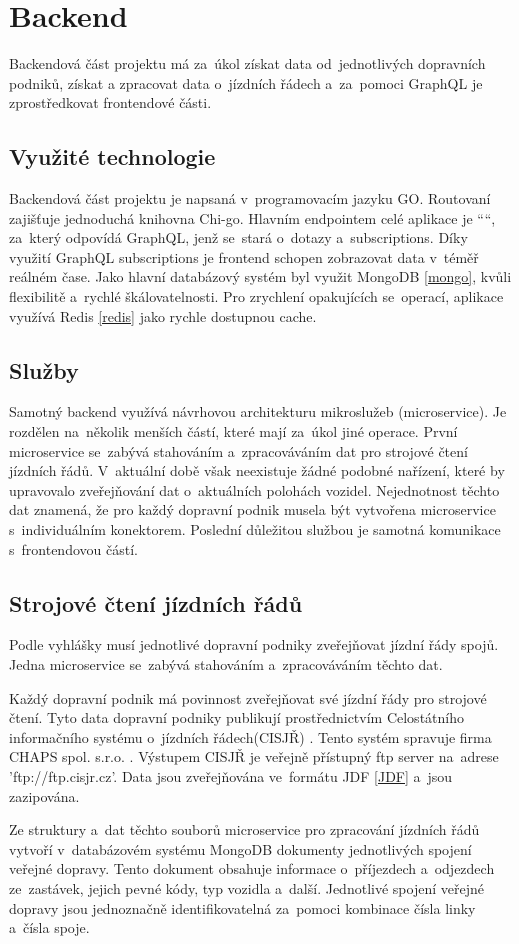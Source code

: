 \section{Backend}
Backendová část projektu má za~úkol získat data od~jednotlivých dopravních podniků, získat a zpracovat data o~jízdních řádech \cite{cisjr} a~za~pomoci GraphQL je zprostředkovat frontendové části.
\subsection{Využité technologie} Backendová část projektu je napsaná v~programovacím jazyku GO. Routovaní zajišťuje jednoduchá knihovna Chi-go. Hlavním endpointem celé aplikace je ““, za~který odpovídá GraphQL, jenž se~stará o~dotazy a~subscriptions. Díky využití GraphQL subscriptions je frontend schopen zobrazovat data v~téměř reálném čase. Jako hlavní databázový systém byl využit MongoDB \ref{mongo}, kvůli flexibilitě a~rychlé škálovatelnosti. Pro zrychlení opakujících se~operací, aplikace využívá Redis \ref{redis} jako rychle dostupnou cache. \par
\subsection{Služby}
Samotný backend využívá návrhovou architekturu mikroslužeb (microservice). Je rozdělen na~několik menších částí, které mají za~úkol jiné operace. První microservice se~zabývá stahováním a~zpracováváním dat pro strojové čtení jízdních řádů. V~aktuální době však neexistuje žádné podobné nařízení, které by upravovalo zveřejňování dat o~aktuálních polohách vozidel. Nejednotnost těchto dat znamená, že pro každý dopravní podnik musela být vytvořena microservice s~individuálním konektorem. Poslední důležitou službou je samotná komunikace s~frontendovou částí.
\subsection [Jízdní řády]{Strojové čtení jízdních řádů} \label{strojoveCteniJR}
Podle vyhlášky \cite{vyhlaskaJizdniRady} musí jednotlivé dopravní podniky zveřejňovat jízdní řády spojů. Jedna microservice se~zabývá stahováním a~zpracováváním těchto dat. \par
Každý dopravní podnik má povinnost zveřejňovat své jízdní řády pro strojové čtení. Tyto data dopravní podniky publikují prostřednictvím Celostátního informačního systému o~jízdních řádech(CISJŘ) \cite{cisjr}. Tento systém spravuje firma CHAPS spol. s.r.o. \cite{chaps}. Výstupem CISJŘ je veřejně přístupný ftp server na~adrese 'ftp://ftp.cisjr.cz'. Data jsou zveřejňována ve~formátu JDF \ref{JDF} a~jsou zazipována. \par
Ze struktury a~dat těchto souborů microservice pro zpracování jízdních řádů vytvoří v~databázovém systému MongoDB dokumenty jednotlivých spojení veřejné dopravy. Tento dokument obsahuje informace o~příjezdech a~odjezdech ze~zastávek, jejich pevné kódy, typ vozidla a~další. Jednotlivé spojení veřejné dopravy jsou jednoznačně identifikovatelná za~pomoci kombinace čísla linky a~čísla spoje.
